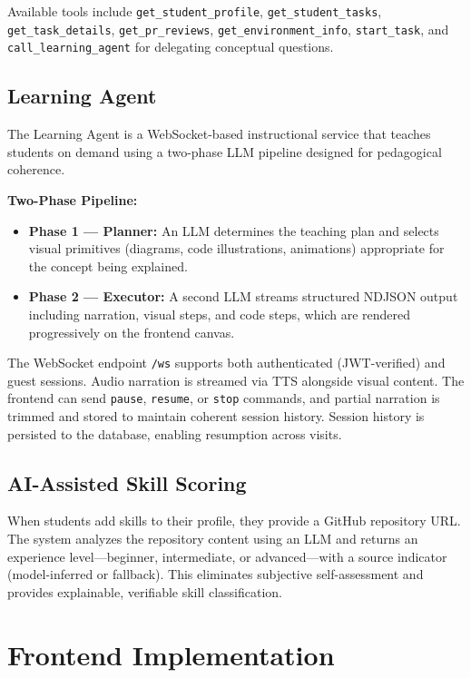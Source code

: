 \documentclass[runningheads]{llncs}
\begin{document}
Available tools include \texttt{get\_student\_profile}, \texttt{get\_student\_tasks}, \texttt{get\_task\_details}, \texttt{get\_pr\_reviews}, \texttt{get\_environment\_info}, \texttt{start\_task}, and \texttt{call\_learning\_agent} for delegating conceptual questions.

\subsection{Learning Agent}

The Learning Agent is a WebSocket-based instructional service that teaches students on demand using a two-phase LLM pipeline designed for pedagogical coherence.

\noindent\textbf{Two-Phase Pipeline:}
\begin{itemize}
    \item \textbf{Phase 1 --- Planner:} An LLM determines the teaching plan and selects visual primitives (diagrams, code illustrations, animations) appropriate for the concept being explained.
    \item \textbf{Phase 2 --- Executor:} A second LLM streams structured NDJSON output including narration, visual steps, and code steps, which are rendered progressively on the frontend canvas.
\end{itemize}

The WebSocket endpoint \texttt{/ws} supports both authenticated (JWT-verified) and guest sessions. Audio narration is streamed via TTS alongside visual content. The frontend can send \texttt{pause}, \texttt{resume}, or \texttt{stop} commands, and partial narration is trimmed and stored to maintain coherent session history. Session history is persisted to the database, enabling resumption across visits.

\subsection{AI-Assisted Skill Scoring}

When students add skills to their profile, they provide a GitHub repository URL. The system analyzes the repository content using an LLM and returns an experience level---beginner, intermediate, or advanced---with a source indicator (model-inferred or fallback). This eliminates subjective self-assessment and provides explainable, verifiable skill classification.

\section{Frontend Implementation}
\label{sec:frontend}
\end{document}
